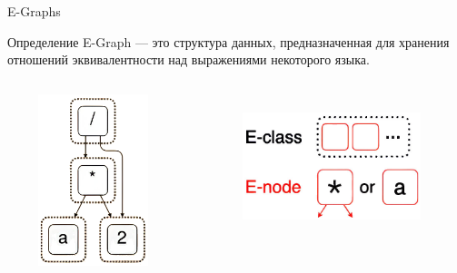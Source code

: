 \documentclass[aspectratio=169
  , xcolor={svgnames}
  , russian  %
  ]{beamer}
\begin{document}
\begin{frame}{E-Graphs}
    \begin{block}{Определение}
        E-Graph --- это структура данных, предназначенная для хранения отношений эквивалентности над выражениями некоторого языка.
    \end{block}

    \begin{columns}
        \begin{column}{0.5\textwidth}
            \centering
            \includegraphics[width=5cm, height=5cm]{misc/egraphs_images/egraph_1.png} %
        \end{column}
        \begin{column}{0.5\textwidth}
            \centering
            \includegraphics[width=5.2cm, height=4.2cm]{misc/egraphs_images/enodes_eclasses.jpg} %
        \end{column}
    \end{columns}

\end{frame}
\end{document}
